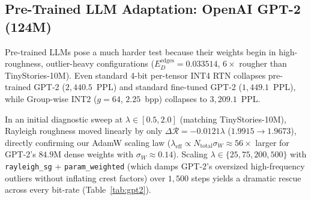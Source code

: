\documentclass[11pt,a4paper]{article}
\begin{document}
\subsection{Pre-Trained LLM Adaptation: OpenAI GPT-2 (124M)}
\label{sec:gpt2}
Pre-trained LLMs pose a much harder test because their weights begin in high-roughness, outlier-heavy configurations ($E_D^{\text{edges}} = 0.033514$, $6\times$ rougher than TinyStories-10M). Even standard 4-bit per-tensor INT4 RTN collapses pre-trained GPT-2 ($2{,}440.5$~PPL) and standard fine-tuned GPT-2 ($1{,}449.1$~PPL), while Group-wise INT2 ($g=64$, $2.25$~bpp) collapses to $3{,}209.1$~PPL.

In an initial diagnostic sweep at $\lambda \in [0.5, 2.0]$ (matching TinyStories-10M), Rayleigh roughness moved linearly by only $\Delta\mathcal{R} = -0.0121\lambda$ ($1.9915 \to 1.9673$), directly confirming our AdamW scaling law ($\lambda_{\text{eff}} \propto N_{\text{total}}\sigma_W \approx 56\times$ larger for GPT-2's $84.9$M dense weights with $\sigma_W \approx 0.14$). Scaling $\lambda \in \{25, 75, 200, 500\}$ with \texttt{rayleigh\_sg} + \texttt{param\_weighted} (which damps GPT-2's oversized high-frequency outliers without inflating crest factors) over $1{,}500$ steps yields a dramatic rescue across every bit-rate (Table~\ref{tab:gpt2}).
\end{document}

